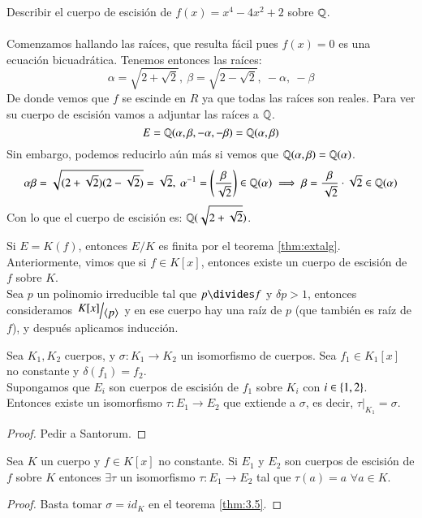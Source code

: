 \begin{ex}
    Describir el cuerpo de escisión de $f(x) = x^4 - 4x^2 + 2$ sobre $\mathbb{Q}$.\\\\
    Comenzamos hallando las raíces, que resulta fácil pues $f(x) = 0$ es una ecuación bicuadrática. Tenemos entonces las raíces:
    $$
        \alpha = \sqrt{2 + \sqrt 2},\ \beta = \sqrt{2 - \sqrt{2}},\ -\alpha,\ -\beta
    $$
    De donde vemos que $f$ se escinde en $R$ ya que todas las raíces son reales. Para ver su cuerpo de escisión vamos a adjuntar las raíces a $\mathbb{Q}$.
    $$
        E = \mathbb{Q}(\alpha,  \beta, -\alpha, -\beta) = \mathbb{Q}(\alpha, \beta)
    $$
    Sin embargo, podemos reducirlo aún más si vemos que $\mathbb{Q}(\alpha, \beta) = \mathbb{Q}(\alpha)$.
    $$
        \alpha\beta = \sqrt{(2 + \sqrt 2)(2 - \sqrt 2)} = \sqrt 2,\ \alpha^{-1} = \left(\frac{\beta}{\sqrt 2}\right) \in \mathbb{Q}(\alpha) \implies \beta = \frac{\beta}{\sqrt 2} \cdot \sqrt 2 \in \mathbb{Q}(\alpha)
    $$
    Con lo que el cuerpo de escisión es: $\mathbb{Q}(\sqrt{2 + \sqrt 2})$.
\end{ex}

\begin{obs}
    Si $E = K(f)$, entonces $E/K$ es finita por el teorema \ref{thm:extalg}. Anteriormente, vimos que si $f \in K[x]$, entonces existe un cuerpo de escisión de $f$ sobre $K$.\\
    Sea $p$ un polinomio irreducible tal que $p \divides f$ y $\delta p > 1$, entonces consideramos $\quo{K[x]}{\gen{p}}$ y en ese cuerpo hay una raíz de $p$ (que también es raíz de $f$), y después aplicamos inducción.
\end{obs}

\begin{thm}\label{thm:3.5}
    Sea $K_1, K_2$ cuerpos, y $\sigma: K_1 \to K_2$ un isomorfismo de cuerpos. Sea $f_1 \in K_1[x]$ no constante y $\delta(f_1) = f_2$.\\ Supongamos que $E_i$ son cuerpos de escisión de $f_1$ sobre $K_i$ con $i \in \left\{1, 2\right\}$. Entonces existe un isomorfismo $\tau: E_1 \to E_2$ que extiende a $\sigma$, es decir, $\left. \tau \right|_{K_1} = \sigma$.
\end{thm}

\begin{proof}
    Pedir a Santorum. %
\end{proof}

\begin{cor}
    Sea $K$ un cuerpo y $f \in K[x]$ no constante. Si $E_1$ y $E_2$ son cuerpos de escisión de $f$ sobre $K$ entonces $\exists \tau$ un isomorfismo $\tau: E_1 \to E_2$ tal que $\tau(a) = a$ $\forall a \in K$.
\end{cor}
\begin{proof}
    Basta tomar $\sigma = id_K$ en el teorema \ref{thm:3.5}.
\end{proof}

